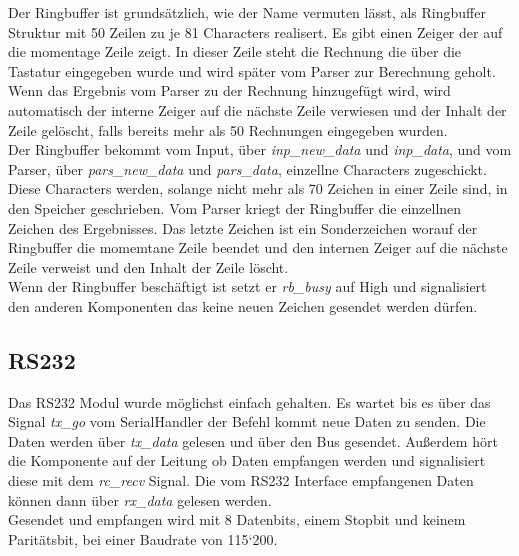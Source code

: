 Der Ringbuffer ist grundsätzlich, wie der Name vermuten lässt, als Ringbuffer Struktur mit 50 Zeilen
zu je 81 Characters realisert. Es gibt einen Zeiger der auf die momentage Zeile zeigt. In dieser Zeile
steht die Rechnung die über die Tastatur eingegeben wurde und wird später vom Parser zur Berechnung
geholt. Wenn das Ergebnis vom Parser zu der Rechnung hinzugefügt wird, wird automatisch der interne Zeiger
auf die nächste Zeile verwiesen und der Inhalt der Zeile gelöscht, falls bereits mehr als 50 Rechnungen
eingegeben wurden.\\
Der Ringbuffer bekommt vom Input, über \textit{inp\_new\_data} und \textit{inp\_data}, und vom Parser, 
über \textit{pars\_new\_data} und \textit{pars\_data}, einzellne Characters zugeschickt.\\
Diese Characters werden, solange nicht mehr als 70 Zeichen in einer Zeile sind, in den Speicher geschrieben.
Vom Parser kriegt der Ringbuffer die einzellnen Zeichen des Ergebnisses. Das letzte Zeichen ist ein
Sonderzeichen worauf der Ringbuffer die momemtane Zeile beendet und den internen Zeiger auf die nächste
Zeile verweist und den Inhalt der Zeile löscht.\\
Wenn der Ringbuffer beschäftigt ist setzt er \textit{rb\_busy} auf High und signalisiert den anderen
Komponenten das keine neuen Zeichen gesendet werden dürfen.


\subsection{RS232}
Das RS232 Modul wurde möglichst einfach gehalten. Es wartet bis es über das Signal 
\textit{tx\_go} vom SerialHandler der Befehl kommt neue Daten zu senden. Die Daten
werden über \textit{tx\_data} gelesen und über den Bus gesendet. Außerdem
hört die Komponente auf der Leitung ob Daten empfangen werden und signalisiert diese 
mit dem \textit{rc\_recv} Signal. Die vom RS232 Interface empfangenen Daten können 
dann über \textit{rx\_data} gelesen werden.\\
Gesendet und empfangen wird mit 8 Datenbits, einem Stopbit und keinem Paritätsbit, bei einer
Baudrate von 115`200.
